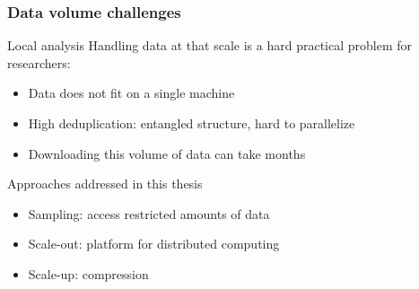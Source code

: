 \documentclass[aspectratio=169,xcolor=table]{beamer}
\begin{document}
    \begin{frame}
        \frametitle{Data volume challenges}

        \begin{block}{Local analysis}
            Handling data at that scale is a hard practical problem for
            researchers:
            \begin{itemize}
                \item Data does not fit on a single machine
                \item High deduplication: entangled structure, hard to
                    parallelize
                \item Downloading this volume of data can take months
            \end{itemize}
        \end{block}

        \begin{block}{Approaches addressed in this thesis}
            \begin{itemize}
                \item Sampling: access restricted amounts of data
                \item Scale-out: platform for distributed computing
                \item Scale-up: compression
            \end{itemize}
        \end{block}
    \end{frame}
\end{document}
